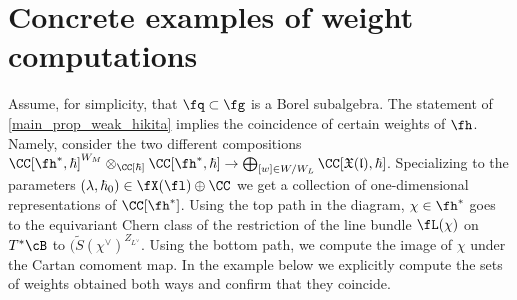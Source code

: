 \documentclass[12pt]{amsart}
\begin{document}








\appendix
\section{Concrete examples of weight computations}\label{appendixA}
Assume, for simplicity, that $\fq\subset \fg$ is a Borel subalgebra. The statement of \cref{main_prop_weak_hikita} implies the coincidence of certain weights of $\fh$. Namely, consider the two different compositions $\CC[\fh^*, \hbar]^{W_M}\otimes_{\CC[\hbar]} \CC[\fh^*, \hbar]\to \bigoplus_{[w] \in W/W_L}\CC[\mathfrak{X}(\mathfrak{l}),\hbar] $. Specializing to the parameters $(\lambda, \hbar_0)\in \fX(\fl)\oplus \CC$ we get a collection of one-dimensional representations of $\CC[\fh^*]$. Using the top path in the diagram, $\chi\in \fh^*$ goes to the equivariant Chern class of the restriction of the line bundle $\fL(\chi)$ on $T^*\cB$ to $(\widetilde{S}(\chi^\vee)^{Z_{L^\vee}}$. Using the bottom path, we compute the image of $\chi$ under the Cartan comoment map. In the example below we explicitly compute the sets of weights obtained both ways and confirm that they coincide.
\end{document}
